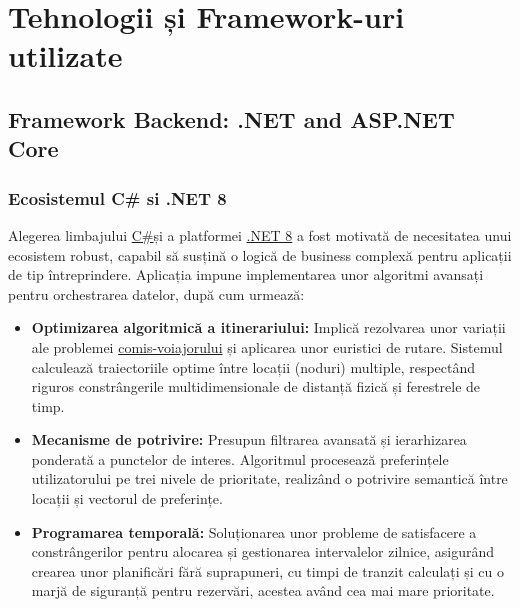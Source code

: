 \chapter{Tehnologii și Framework-uri utilizate}

\section{Framework Backend: .NET and ASP.NET Core}

\subsection{Ecosistemul C\# si .NET 8}
Alegerea limbajului \href{https://books.google.ro/books?hl=ro&lr=&id=6L1Rm031qCkC&oi=fnd&pg=PA3&dq=c%23+language&ots=5yOX9xRYsM&sig=MqDiu-i5oopbHbnfK348lA-mM3o&redir_esc=y#v=onepage&q=c%23%20language&f=false}{C\#}\cite{cSharp_ref}și 
a platformei \href{https://learn.microsoft.com/en-us/dotnet/core/whats-new/dotnet-8/overview}{.NET 8}\cite{net8_ref} a fost motivată de necesitatea unui ecosistem robust, capabil să susțină o logică de 
business complexă pentru aplicații de tip întreprindere. Aplicația impune implementarea unor algoritmi avansați pentru orchestrarea datelor, după cum urmează:

\begin{itemize}
    \item  \textbf{Optimizarea algoritmică a itinerariului:} Implică rezolvarea unor variații ale problemei \href{https://www.sciencedirect.com/science/article/pii/S0166218X14001486#a000005}{comis-voiajorului}\cite{tspNN_ref} și aplicarea unor euristici de rutare. Sistemul calculează traiectoriile optime între locații (noduri) multiple, respectând riguros constrângerile multidimensionale de distanță fizică și ferestrele de timp.
    \item  \textbf{Mecanisme de potrivire:} Presupun filtrarea avansată și ierarhizarea ponderată a punctelor de interes. Algoritmul procesează preferințele utilizatorului pe trei nivele de prioritate, realizând o potrivire semantică între locații și vectorul de preferințe.
    \item  \textbf{Programarea temporală:} Soluționarea unor probleme de satisfacere a constrângerilor pentru alocarea și gestionarea intervalelor zilnice, asigurând crearea unor planificări fără suprapuneri, cu timpi de tranzit calculați și cu o marjă de siguranță pentru rezervări, acestea având cea mai mare prioritate.

\end{itemize}

